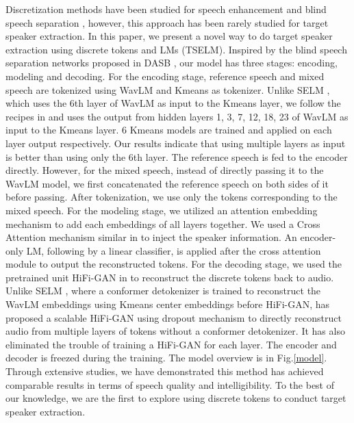 \documentclass[conference]{IEEEtran}
\begin{document}
Discretization methods have been studied for speech 
enhancement \cite{selm} and blind speech separation \cite{dasb,tokensplit}, 
however, this approach has 
been rarely studied for target speaker extraction. In this paper, we present a novel way to do 
target speaker extraction using discrete tokens and LMs (TSELM). Inspired by the blind speech separation 
networks proposed in DASB \cite{dasb}, our model has three stages: encoding, modeling and decoding.
For the encoding stage, reference speech and mixed speech are tokenized using WavLM and 
Kmeans as tokenizer. Unlike SELM \cite{selm}, which uses the 6th layer of WavLM as input to the Kmeans layer, 
we follow the recipes in \cite{dasb} and uses the output from hidden 
layers 1, 3, 7, 12, 18, 23 of WavLM as input to the Kmeans layer. 6 Kmeans models
are trained and applied on each layer output respectively. 
Our results indicate that using multiple layers as 
input is better 
than using only the 6th layer. The reference speech is fed to the encoder directly. 
However, for the mixed speech, instead of directly passing it to the WavLM model, we first concatenated the reference speech on both sides 
of it before passing. After tokenization, we use only the tokens 
corresponding to the mixed speech. For the modeling stage, we utilized an attention 
embedding mechanism to add each embeddings of all layers together. We used a Cross 
Attention mechanism similar in \cite{sef_net} to inject the speaker information. 
An encoder-only LM, following by a linear classifier, is applied after the cross attention module
to output the reconstructed tokens. 
For the decoding stage, we used the pretrained unit HiFi-GAN 
in \cite{unit_hifi} to reconstruct the 
discrete tokens back to audio. Unlike SELM \cite{selm}, where a conformer 
detokenizer is trained 
to reconstruct the WavLM embeddings using Kmeans center embeddings before HiFi-GAN, \cite{unit_hifi} has proposed a scalable HiFi-GAN using dropout mechanism to directly 
reconstruct audio from multiple layers of tokens without a conformer detokenizer. It 
has also eliminated the trouble of training a HiFi-GAN for each layer. The encoder and 
decoder is freezed during the training. The model overview is in Fig.\ref{model}. 
Through extensive studies, we have demonstrated this method has achieved comparable results in terms 
of speech quality and intelligibility. To the best of our knowledge, we are the first to explore 
using discrete tokens to conduct target speaker extraction.
\end{document}
